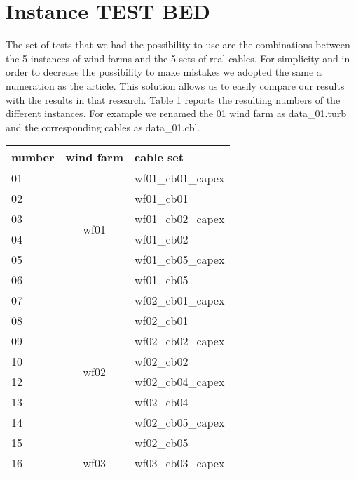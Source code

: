 \section{Instance TEST BED}
The set of tests that we had the possibility to use are the combinations between the 5 instances of wind farms and the 5 sets of real cables. For simplicity and in order to decrease the possibility to make mistakes we adopted the same a numeration as the \cite{wfcp} article. This solution allows us to easily compare our results with the results in that research. 
Table \ref{tab:testBed} reports the resulting numbers of the different instances. For example we renamed the 01 wind farm as data\_01.turb and the corresponding cables as data\_01.cbl. 
\begin{table}[!htbp]\label{tab:testBed}
\center
\begin{tabular}{lcl}
\hline
number & \multicolumn{1}{l}{wind farm} & cable set         \\ \hline
01     & \multirow{6}{*}{wf01}         & wf01\_cb01\_capex \\
02     &                               & wf01\_cb01        \\
03     &                               & wf01\_cb02\_capex \\
04     &                               & wf01\_cb02        \\
05     &                               & wf01\_cb05\_capex \\
06     &                               & wf01\_cb05        \\ \hline
07     & \multirow{8}{*}{wf02}         & wf02\_cb01\_capex \\
08     &                               & wf02\_cb01        \\
09     &                               & wf02\_cb02\_capex \\
10     &                               & wf02\_cb02        \\
12     &                               & wf02\_cb04\_capex \\
13     &                               & wf02\_cb04        \\
14     &                               & wf02\_cb05\_capex \\
15     &                               & wf02\_cb05        \\ \hline
16     & \multirow{4}{*}{wf03}         & wf03\_cb03\_capex \\

\end{tabular}
\end{table}
